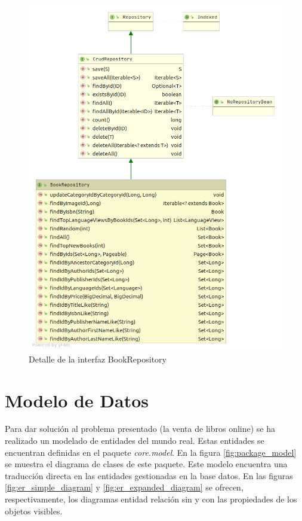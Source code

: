 \documentclass[a4paper,12pt,twoside,openright]{report}
\begin{document}
   	\begin{figure}[htb!]
   		\centering
   		\includegraphics[width=\textwidth,keepaspectratio]{detail_bookRepository}
   		\caption{Detalle de la interfaz BookRepository}
   		\label{fig:detail_bookRepository}
   	\end{figure}
    	
    
    \section{Modelo de Datos}
    Para dar solución al problema presentado (la venta de libros online) se ha realizado un modelado de entidades del mundo real. Estas entidades se encuentran definidas en el paquete \emph{core.model}. En la figura \ref{fig:package_model} se muestra el diagrama de clases de este paquete. Este modelo encuentra una traducción directa en las entidades gestionadas en la base datos. En las figuras \ref{fig:er_simple_diagram} y \ref{fig:er_expanded_diagram} se ofrecen, respectivamente, los diagramas entidad relación sin y con las propiedades de los objetos visibles.
    
\end{document}
